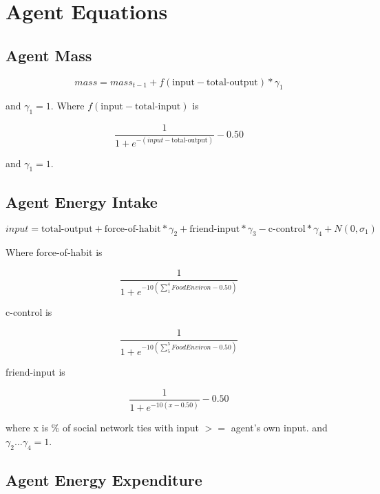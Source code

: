 \documentclass[12pt]{article}
\begin{document}
\section{Agent Equations}

\subsection{Agent Mass}

\begin{equation}
mass = mass_{t-1} + f(\text{input} - \text{total-output}) * \gamma_1
\end{equation}

and $\gamma_1 = 1$. Where $f(\text{input} - \text{total-input})$ is

\begin{equation}
\frac{1}{1 + e^{-(input - \text{total-output})}} - 0.50
\end{equation}

and $\gamma_1 = 1$.


\subsection{Agent Energy Intake}

\begin{equation}
input = \text{total-output} + \text{force-of-habit} * \gamma_2 +
\text{friend-input} * \gamma_3 - \text{c-control}* \gamma_4 + N(0, \sigma_1)
\end{equation}

Where force-of-habit is

\begin{equation}
\frac{1}{1 + e^{-10(\sum_{1}^{4}FoodEnviron - 0.50)}}
\end{equation}

c-control is

\begin{equation}
\frac{1}{1 + e^{-10(\sum_{5}^{5}FoodEnviron - 0.50)}}
\end{equation}

friend-input is

\begin{equation}
\frac{1}{1 + e^{-10(x - 0.50)}} - 0.50
\end{equation}

where x is \% of social network ties with input $>=$ agent's own input. and $ \gamma_2 \ldots \gamma_4 = 1$.

\subsection{Agent Energy Expenditure}
\end{document}
